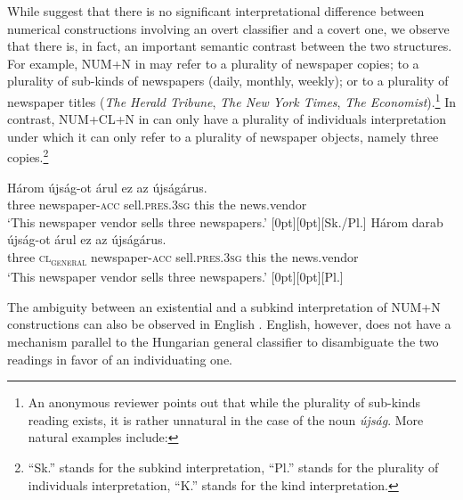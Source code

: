 \documentclass[output=paper]{langscibook}
\begin{document}
While \citet{schvarcz-rothstein-17} suggest that there is no significant interpretational difference between numerical constructions involving an overt classifier and a covert one, we observe that there is, in fact, an important semantic contrast between the two structures. For example, NUM+N in  may refer to a plurality of newspaper copies; to a plurality of sub-kinds of newspapers (daily, monthly, weekly); or to a plurality of newspaper titles (\textit{The Herald Tribune}, \textit{The New York Times}, \textit{The Economist}).\footnote{An anonymous reviewer points out that while the plurality of sub-kinds reading exists, it is rather unnatural in the case of the noun \textit{újság}. More natural examples include: 

\z} In contrast, NUM+CL+N in  can only have a plurality of individuals interpretation under which it can only refer to a plurality of newspaper objects, namely three copies.\footnote{``Sk.'' stands for the subkind interpretation, ``Pl.'' stands for the plurality of individuals interpretation, ``K.'' stands for the kind interpretation.}

\ea \label{schv-nem:ex:8}
\ea \label{schv-nem:ex:8a}
\gll Három újság-ot árul ez az újságárus.\\
three newspaper-\textsc{acc} sell.\textsc{pres}.\textsc{3sg} this the news.vendor\\
\glt `This newspaper vendor sells three newspapers.'  \hfill \raisebox{2.3\baselineskip}[0pt][0pt]{[Sk./Pl.]}
\ex \label{schv-nem:ex:8b}
\gll Három darab újság-ot árul ez az újságárus.\\
three \textsc{cl\textsubscript{general}} newspaper-\textsc{acc} sell.\textsc{pres}.\textsc{3sg} this the news.vendor\\
\glt `This newspaper vendor sells three newspapers.'   \hfill \raisebox{2.3\baselineskip}[0pt][0pt]{[Pl.]}
\z
\z

\noindent The ambiguity between an existential and a subkind interpretation of NUM+N constructions can also be observed in English . English, however, does not have a mechanism parallel to the Hungarian general classifier to disambiguate the two readings in favor of an individuating one. 
\end{document}
